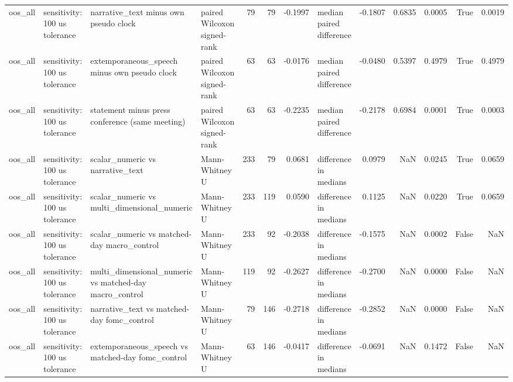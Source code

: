 \begin{tabular}{llllrrrlrrrrr}
oos_all & sensitivity: 100 us tolerance & narrative_text minus own pseudo clock & paired Wilcoxon signed-rank & 79 & 79 & -0.1997 & median paired difference & -0.1807 & 0.6835 & 0.0005 & True & 0.0019 \\
oos_all & sensitivity: 100 us tolerance & extemporaneous_speech minus own pseudo clock & paired Wilcoxon signed-rank & 63 & 63 & -0.0176 & median paired difference & -0.0480 & 0.5397 & 0.4979 & True & 0.4979 \\
oos_all & sensitivity: 100 us tolerance & statement minus press conference (same meeting) & paired Wilcoxon signed-rank & 63 & 63 & -0.2235 & median paired difference & -0.2178 & 0.6984 & 0.0001 & True & 0.0003 \\
oos_all & sensitivity: 100 us tolerance & scalar_numeric vs narrative_text & Mann-Whitney U & 233 & 79 & 0.0681 & difference in medians & 0.0979 & NaN & 0.0245 & True & 0.0659 \\
oos_all & sensitivity: 100 us tolerance & scalar_numeric vs multi_dimensional_numeric & Mann-Whitney U & 233 & 119 & 0.0590 & difference in medians & 0.1125 & NaN & 0.0220 & True & 0.0659 \\
oos_all & sensitivity: 100 us tolerance & scalar_numeric vs matched-day macro_control & Mann-Whitney U & 233 & 92 & -0.2038 & difference in medians & -0.1575 & NaN & 0.0002 & False & NaN \\
oos_all & sensitivity: 100 us tolerance & multi_dimensional_numeric vs matched-day macro_control & Mann-Whitney U & 119 & 92 & -0.2627 & difference in medians & -0.2700 & NaN & 0.0000 & False & NaN \\
oos_all & sensitivity: 100 us tolerance & narrative_text vs matched-day fomc_control & Mann-Whitney U & 79 & 146 & -0.2718 & difference in medians & -0.2852 & NaN & 0.0000 & False & NaN \\
oos_all & sensitivity: 100 us tolerance & extemporaneous_speech vs matched-day fomc_control & Mann-Whitney U & 63 & 146 & -0.0417 & difference in medians & -0.0691 & NaN & 0.1472 & False & NaN \\
\bottomrule
\end{tabular}
